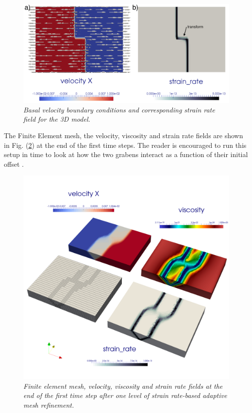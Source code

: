 \documentclass{article}
\begin{document}
\begin{figure}
  \centering
  \includegraphics[width=\textwidth]{cookbooks/crustal_deformation/bottombc2.png}
  \caption{\it Basal velocity boundary conditions and corresponding 
  strain rate field for the 3D model.} 
  \label{fig:bottombc}
\end{figure}

The Finite Element mesh, the velocity, viscosity and strain rate fields are shown 
in Fig. (\ref{fig:ext3D}) at the end of the first time steps. The reader is encouraged
to run this setup in time to look at how the two grabens interact as a function 
of their initial offset \cite{alht11,alht12,alhf13}.

\begin{figure}
\centering
\includegraphics[width=\textwidth]{cookbooks/crustal_deformation/all3D.png}
\caption{\it Finite element mesh, velocity, viscosity and strain rate fields at
the end of the first time step after one level of strain rate-based adaptive mesh refinement.} 
\label{fig:ext3D}
\end{figure}
\end{document}
